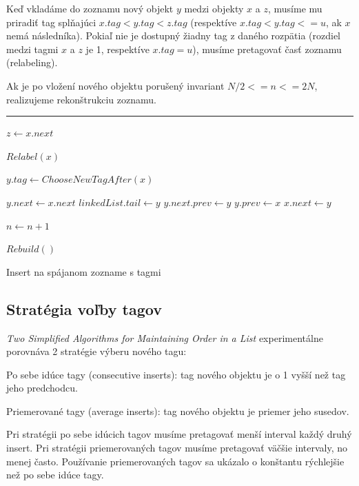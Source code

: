 \documentclass[
  digital,     %
  oneside,     %
  nosansbold,  %
  nocolorbold, %
  lof,         %
  lot,         %
]{fithesis4}
\begin{document}
Keď vkladáme do zoznamu nový objekt $y$ medzi objekty $x$ a $z$, musíme mu priradiť tag splňajúci $x.tag < y.tag < z.tag$ (respektíve $x.tag < y.tag <= u$, ak $x$ nemá následníka).
Pokiaľ nie je dostupný žiadny tag z daného rozpätia (rozdiel medzi tagmi $x$ a $z$ je 1, respektíve $x.tag = u$), musíme pretagovať časť zoznamu (relabeling).

Ak je po vložení nového objektu porušený invariant $N/2 <= n <= 2N$, realizujeme rekonštrukciu zoznamu.

\begin{algorithm}
\hrule\vspace{0.2em}
$z \leftarrow x.next$\;

{
    $Relabel(x)$\;
}

$y.tag \leftarrow ChooseNewTagAfter(x)$\;

$y.next \leftarrow x.next$\;
{
    $linkedList.tail \leftarrow y$\;
}
\Else
{
    $y.next.prev \leftarrow y$\;
}
$y.prev \leftarrow x$\;
$x.next \leftarrow y$\;


$n \leftarrow n + 1$\;

{
    $Rebuild()$\;
}
\caption{Insert na spájanom zozname s tagmi}
\end{algorithm}

\subsection*{Stratégia voľby tagov}

\textit{Two Simplified Algorithms for Maintaining Order in a List} \cite{paper1_ordered_list} experimentálne porovnáva 2 stratégie výberu nového tagu:
\begin{compactenum}
  \item Po sebe idúce tagy (consecutive inserts): tag nového objektu je o 1 vyšší než tag jeho predchodcu.
  \item Priemerované tagy (average inserts): tag nového objektu je priemer jeho susedov.
\end{compactenum}
Pri stratégii po sebe idúcich tagov musíme pretagovať menší interval každý druhý insert. Pri stratégii priemerovaných tagov musíme pretagovať väčšie intervaly, no menej často. Používanie priemerovaných tagov sa ukázalo o konštantu rýchlejšie než po sebe idúce tagy.
\end{document}
